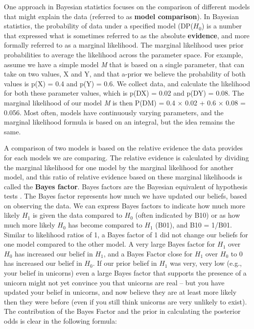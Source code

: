 \documentclass[
  oneside]{book}
\begin{document}
One approach in Bayesian statistics focuses on the comparison of different models that might explain the data (referred to as \textbf{model comparison}). In Bayesian statistics, the probability of data under a specified model (D\textbar P(\(H_0\)) is a number that expressed what is sometimes referred to as the absolute \textbf{evidence}, and more formally referred to as a marginal likelihood. The marginal likelihood uses prior probabilities to average the likelihood across the parameter space. For example, assume we have a simple model \emph{M} that is based on a single parameter, that can take on two values, X and Y, and that a-prior we believe the probability of both values is p(X) = 0.4 and p(Y) = 0.6. We collect data, and calculate the likelihood for both these parameter values, which is p(D\textbar X) = 0.02 and p(D\textbar Y) = 0.08. The marginal likelihood of our model \emph{M} is then P(D\textbar M) = 0.4 × 0.02 + 0.6 × 0.08 = 0.056. Most often, models have continuously varying parameters, and the marginal likelihood formula is based on an integral, but the idea remains the same.

A comparison of two models is based on the relative evidence the data provides for each models we are comparing. The relative evidence is calculated by dividing the marginal likelihood for one model by the marginal likelihood for another model, and this ratio of relative evidence based on these marginal likelihoods is called the \textbf{Bayes factor}. Bayes factors are the Bayesian equivalent of hypothesis tests \citep{dienes_understanding_2008, kass_bayes_1995}. The Bayes factor represents how much we have updated our beliefs, based on observing the data. We can express Bayes factors to indicate how much more likely \(H_1\) is given the data compared to \(H_0\) (often indicated by B10) or as how much more likely \(H_0\) has become compared to \(H_1\) (B01), and B10 = 1/B01. Similar to likelihood ratios of 1, a Bayes factor of 1 did not change our beliefs for one model compared to the other model. A very large Bayes factor for \(H_1\) over \(H_0\) has increased our belief in \(H_1\), and a Bayes Factor close for \(H_1\) over \(H_0\) to 0 has increased our belief in \(H_0\). If our prior belief in \(H_1\) was very, very low (e.g., your belief in unicorns) even a large Bayes factor that supports the presence of a unicorn might not yet convince you that unicorns are real -- but you have updated your belief in unicorns, and now believe they are at least more likely then they were before (even if you still think unicorns are very unlikely to exist). The contribution of the Bayes Factor and the prior in calculating the posterior odds is clear in the following formula:
\end{document}
